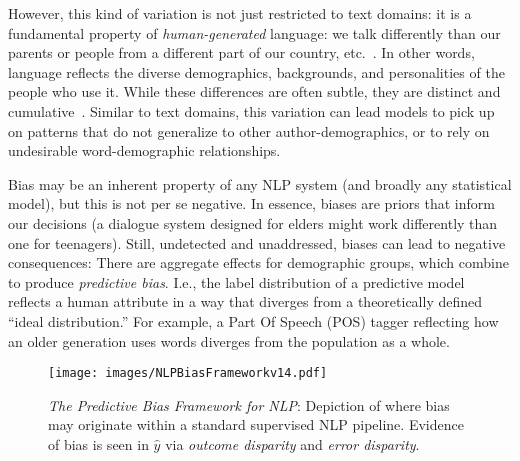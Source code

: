 \documentclass[11pt,a4paper]{article}
\begin{document}
However, this kind of variation is not just restricted to text domains: it is a fundamental property of \textit{human-generated} language: we talk differently than our parents or people from a different part of our country, etc.~\cite{pennebaker2003words,eisenstein2010latent,kern2016gaining}. In other words, language reflects the diverse demographics, backgrounds, and personalities of the people who use it. 
While these differences are often subtle, they are distinct and cumulative~\cite{trudgill2000sociolinguistics,kern2016gaining,pennebaker2011secret}. 
Similar to text domains, this variation can lead models to pick up on patterns that do not generalize to other author-demographics, or to rely on undesirable word-demographic relationships.

Bias may be an inherent property of any NLP system (and broadly any statistical model), but this is not per se negative. In essence, biases are priors that inform our decisions (a dialogue system designed for elders might work differently than one for teenagers). Still, undetected and unaddressed, biases can lead to negative consequences:
There are aggregate effects for demographic groups, which combine to produce \textit{predictive bias}. I.e., the label distribution of a predictive model reflects a human attribute in a way that diverges from a theoretically defined ``ideal distribution.'' For example, a Part Of Speech (POS) tagger reflecting how an older generation uses words \cite{hovy2015tagging} diverges from the population as a whole.

\begin{figure*}[tbh!]
    \centering
    \texttt{[image: images/NLPBiasFrameworkv14.pdf]}
    \caption{\textit{The Predictive Bias Framework for NLP}: Depiction of where bias may originate within a standard supervised NLP pipeline. Evidence of bias is seen in $\hat{y}$ via \textit{outcome disparity} and \textit{error disparity}.}
    \label{fig:origins}
\end{figure*}
\end{document}
